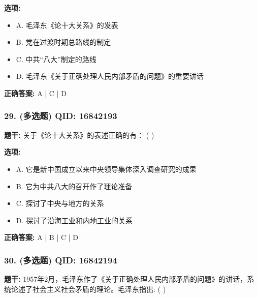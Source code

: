 \documentclass[12pt,UTF8]{ctexart}
\begin{document}
\textbf{选项:}
\begin{itemize}[leftmargin=*]

  \item A. 毛泽东《论十大关系》的发表

  \item B. 党在过渡时期总路线的制定

  \item C. 中共“八大”制定的路线

  \item D. 毛泽东《关于正确处理人民内部矛盾的问题》的重要讲话

\end{itemize}

\textbf{正确答案:}
A | C | D

\vspace{0.3em}\hrulefill\vspace{0.7em}

\subsubsection*{29. (多选题) \small QID: 16842193}

\textbf{题干:}
关于《论十大关系》的表述正确的有： ( )

\textbf{选项:}
\begin{itemize}[leftmargin=*]

  \item A. 它是新中国成立以来中央领导集体深入调查研究的成果

  \item B. 它为中共八大的召开作了理论准备

  \item C. 探讨了中央与地方的关系

  \item D. 探讨了沿海工业和内地工业的关系

\end{itemize}

\textbf{正确答案:}
A | B | C | D

\vspace{0.3em}\hrulefill\vspace{0.7em}

\subsubsection*{30. (多选题) \small QID: 16842194}

\textbf{题干:}
1957年2月，毛泽东作了《关于正确处理人民内部矛盾的问题》的讲话，系统论述了社会主义社会矛盾的理论。毛泽东指出: ( )
\end{document}
